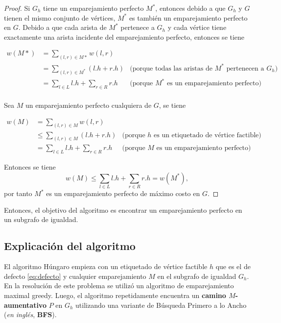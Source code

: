 \documentclass[10pt]{article} %
\begin{document}
	\begin{proof}
		Si $G_h$ tiene un emparejamiento perfecto $M^*$, entonces debido a que $G_h$ y $G$ tienen el mismo conjunto de v\'ertices, $M^*$ es tambi\'en un emparejamiento perfecto en $G$. Debido a que cada arista de $M^*$ pertenece a $G_h$ y cada v\'ertice tiene exactamente una arista incidente del emparejamiento perfecto, entonces se tiene
		
		\begin{align}
			w(M*) &= \sum_{(l,r) \in M*} w(l,r)\\
			&= \sum_{(l,r) \in M^*}(l.h + r.h) &\text{(porque todas las aristas de $M^*$ pertenecen a $G_h$)}\\
			&= \sum_{l \in L}l.h + \sum_{r \in R} r.h &\text{(porque $M^{*}$ es un emparejamiento perfecto)}\\
		\end{align} 
		
		Sea $M$ un emparejamiento perfecto cualquiera de $G$, se tiene
		
		\begin{align}
			w(M) &= \sum_{(l,r) \in M} w(l,r)\\
			&\leq \sum_{(l,r) \in M} (l.h + r.h) &\text{(porque $h$ es un etiquetado de v\'ertice factible)}\\
			&= \sum_{l \in L} l.h + \sum_{r \in R} r.h &\text{(porque $M$ es un emparejamiento perfecto)}
		\end{align}
		
		Entonces se tiene
		\begin{equation}
			w(M) \leq \sum_{l \in L} l.h + \sum_{r \in R} r.h = w(M^*),
		\end{equation}
		por tanto $M^*$ es un emparejamiento perfecto de m\'aximo costo en $G$.
	\end{proof}
	
	Entonces, el objetivo del algoritmo es encontrar un emparejamiento perfecto en un subgrafo de igualdad. 
	
	\subsection{Explicaci\'on del algoritmo}
	
	
	El algoritmo H\'ungaro empieza con un etiquetado de v\'ertice factible $h$ que es el de defecto \ref{eq:defecto} y cualquier emparejamiento $M$ en el subgrafo de igualdad $G_h$.  En la resoluci\'on de este problema se utiliz\'o un algoritmo de emparejamiento maximal greedy. Luego, el algoritmo repetidamente encuentra un \textbf{camino $M$-aumentativo} $P$ en $G_h$ utilizando una variante de B\'usqueda Primero a lo Ancho (\textit{en ingl\'es}, \textbf{BFS}). 
	
\end{document}
